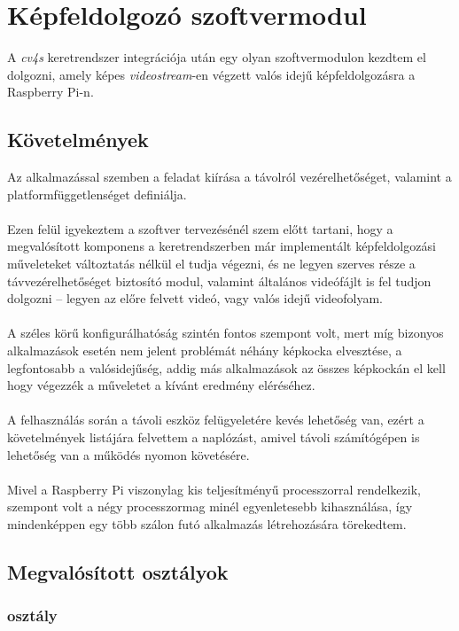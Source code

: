 \chapter{Képfeldolgozó szoftvermodul}

A \emph{cv4s} keretrendszer integrációja után egy olyan szoftvermodulon kezdtem el dolgozni, amely képes \textit{videostream}-en végzett valós idejű képfeldolgozásra a Raspberry Pi-n. 

\section{Követelmények}

Az alkalmazással szemben a feladat kiírása a távolról vezérelhetőséget, valamint a platformfüggetlenséget definiálja. \\
\\
Ezen felül igyekeztem a szoftver tervezésénél szem előtt tartani, hogy a megvalósított komponens a keretrendszerben már implementált képfeldolgozási műveleteket változtatás nélkül el tudja végezni, és ne legyen szerves része a távvezérelhetőséget biztosító modul, valamint általános videófájlt is fel tudjon dolgozni -- legyen az előre felvett videó, vagy valós idejű videofolyam.\\
\\
A széles körű konfigurálhatóság szintén fontos szempont volt, mert míg bizonyos alkalmazások esetén nem jelent problémát néhány képkocka elvesztése, a legfontosabb a valósidejűség, addig más alkalmazások az összes képkockán el kell hogy végezzék a műveletet a kívánt eredmény eléréséhez.\\
\\
A felhasználás során a távoli eszköz felügyeletére kevés lehetőség van, ezért a követelmények listájára felvettem a naplózást, amivel távoli számítógépen is lehetőség van a működés nyomon követésére.\\
\\
Mivel a Raspberry Pi viszonylag kis teljesítményű processzorral rendelkezik, szempont volt a négy processzormag minél egyenletesebb kihasználása, így mindenképpen egy több szálon futó alkalmazás létrehozására törekedtem.

\section{Megvalósított osztályok}

\subsection{ osztály}

